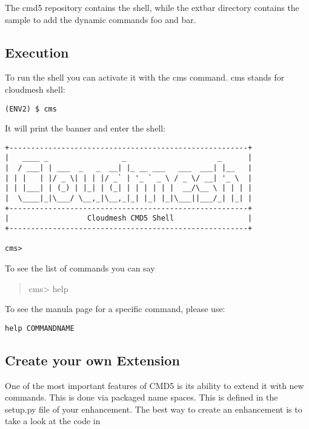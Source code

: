 The cmd5 repository contains the shell, while the extbar directory
contains the sample to add the dynamic commands foo and bar.

\subsection{Execution}\label{execution}

To run the shell you can activate it with the cms command. cms stands
for cloudmesh shell:

\begin{verbatim}
(ENV2) $ cms
\end{verbatim}

It will print the banner and enter the shell:

\begin{verbatim}
+-------------------------------------------------------+
|   ____ _                 _                     _      |
|  / ___| | ___  _   _  __| |_ __ ___   ___  ___| |__   |
| | |   | |/ _ \| | | |/ _` | '_ ` _ \ / _ \/ __| '_ \  |
| | |___| | (_) | |_| | (_| | | | | | |  __/\__ \ | | | |
|  \____|_|\___/ \__,_|\__,_|_| |_| |_|\___||___/_| |_| |
+-------------------------------------------------------+
|                  Cloudmesh CMD5 Shell                 |
+-------------------------------------------------------+

cms>
\end{verbatim}

To see the list of commands you can say

\begin{quote}
cms\textgreater{} help
\end{quote}

To see the manula page for a specific command, please use:

\begin{verbatim}
help COMMANDNAME
\end{verbatim}

\subsection{Create your own Extension}\label{create-your-own-extension}

One of the most important features of CMD5 is its ability to extend it
with new commands. This is done via packaged name spaces. This is
defined in the setup.py file of your enhancement. The best way to create
an enhancement is to take a look at the code in


